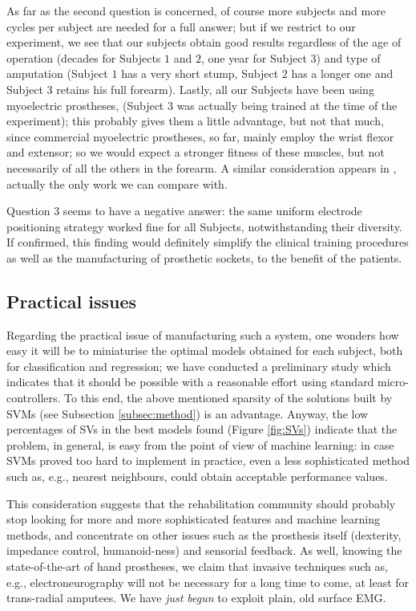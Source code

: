 \documentclass[review,authoryear]{elsarticle}
\renewcommand{\cite}{\citep}
\begin{document}
As far as the second question is concerned, of course more subjects and more cycles per
subject are needed for a full answer; but if we restrict to our experiment, we see that
our subjects obtain good results regardless of the age of operation (decades for Subjects
$1$ and $2$, one year for Subject $3$) and type of amputation (Subject $1$ has a very
short stump, Subject $2$ has a longer one and Subject $3$ retains his full forearm).
Lastly, all our Subjects have been using myoelectric prostheses, (Subject $3$
was actually being trained at the time of the experiment); this probably gives them
a little advantage, but not that much, since commercial myoelectric prostheses, so far,
mainly employ the wrist flexor and extensor; so we would expect a stronger fitness of
these muscles, but not necessarily of all the others in the forearm. A similar consideration
appears in \cite{sebelius}, actually the only work we can compare with.

Question $3$ seems to have a negative answer: the same uniform electrode positioning strategy
worked fine for all Subjects, notwithstanding their diversity.
If confirmed, this finding would definitely simplify the clinical training procedures as well
as the manufacturing of prosthetic sockets, to the benefit of the patients.

\subsection{Practical issues}

Regarding the practical issue of manufacturing such a system,
one wonders how easy it will be to miniaturise the optimal
models obtained for each subject, both for classification and regression;
we have conducted a preliminary study which indicates that it should be possible
with a reasonable effort using standard micro-controllers. To this end, the
above mentioned sparsity of the solutions built by SVMs (see Subsection
\ref{subsec:method}) is an advantage. Anyway, the low percentages of SVs in the
best models found (Figure \ref{fig:SVs}) indicate that the problem, in general,
is easy from the point of view of machine learning: in case SVMs proved too
hard to implement in practice, even a less sophisticated method such as, e.g.,
nearest neighbours, could obtain acceptable performance values.

This consideration suggests that the rehabilitation community should probably stop
looking for more and more sophisticated features and machine learning methods,
and concentrate on other issues such as the prosthesis itself (dexterity, impedance
control, humanoid-ness) and sensorial feedback. As well, knowing the state-of-the-art of
hand prostheses, we claim that invasive techniques such as, e.g., electroneurography
\cite{cipriani} will not be necessary for a long time to come, at least for
trans-radial amputees. We have \emph{just begun} to exploit plain, old surface EMG.
\end{document}
